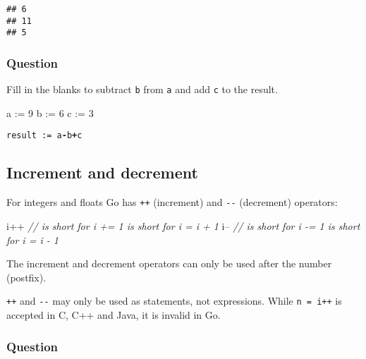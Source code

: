 \documentclass[]{book}
\newenvironment{Shaded}{\begin{snugshade}}{\end{snugshade}}
\newcommand{\CommentTok}[1]{\textcolor[rgb]{0.56,0.35,0.01}{\textit{#1}}}
\newcommand{\DecValTok}[1]{\textcolor[rgb]{0.00,0.00,0.81}{#1}}
\newcommand{\NormalTok}[1]{#1}
\begin{document}
\begin{verbatim}
## 6
## 11
## 5
\end{verbatim}

\hypertarget{question-12}{%
\subsubsection*{Question}\label{question-12}}

Fill in the blanks to subtract \texttt{b} from \texttt{a} and add \texttt{c} to the result.

\begin{Shaded}
\begin{Highlighting}[]
\NormalTok{a := }\DecValTok{9}
\NormalTok{b := }\DecValTok{6}
\NormalTok{c := }\DecValTok{3}
\end{Highlighting}
\end{Shaded}

\texttt{result\ :=\ a}\textbf{\texttt{-}}\texttt{b}\textbf{\texttt{+}}\texttt{c}

\hypertarget{increment-and-decrement}{%
\subsection{Increment and decrement}\label{increment-and-decrement}}

For integers and floats Go has \texttt{++} (increment) and \texttt{-\/-} (decrement) operators:

\begin{Shaded}
\begin{Highlighting}[]
\NormalTok{i++ }\CommentTok{// is short for i += 1 is short for i = i + 1}
\NormalTok{i-- }\CommentTok{// is short for i -= 1 is short for i = i - 1}
\end{Highlighting}
\end{Shaded}

The increment and decrement operators can only be used after the number
(postfix).

\texttt{++} and \texttt{-\/-} may only be used as statements, not expressions. While \texttt{n\ =\ i++}
is accepted in C, C++ and Java, it is invalid in Go.

\hypertarget{question-13}{%
\subsubsection*{Question}\label{question-13}}
\end{document}
